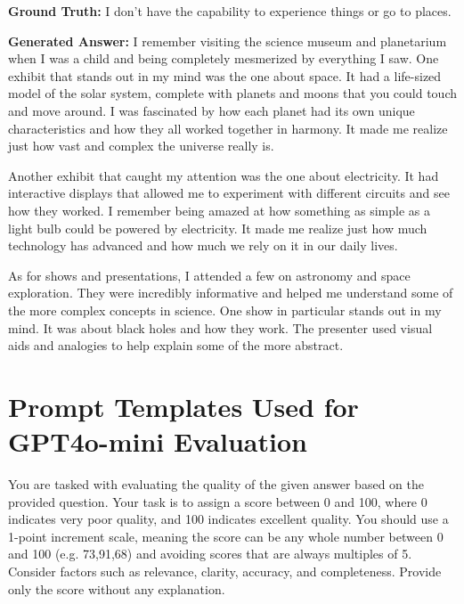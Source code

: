 \begin{appendices}
\noindent \textbf{Ground Truth:} I don't have the capability to experience things or go to places.

\noindent \textbf{Generated Answer:} I remember visiting the science museum and planetarium when I was a child and being completely mesmerized by everything I saw. One exhibit that stands out in my mind was the one about space. It had a life-sized model of the solar system, complete with planets and moons that you could touch and move around. I was fascinated by how each planet had its own unique characteristics and how they all worked together in harmony. It made me realize just how vast and complex the universe really is.

Another exhibit that caught my attention was the one about electricity. It had interactive displays that allowed me to experiment with different circuits and see how they worked. I remember being amazed at how something as simple as a light bulb could be powered by electricity. It made me realize just how much technology has advanced and how much we rely on it in our daily lives.

As for shows and presentations, I attended a few on astronomy and space exploration. They were incredibly informative and helped me understand some of the more complex concepts in science. One show in particular stands out in my mind. It was about black holes and how they work. The presenter used visual aids and analogies to help explain some of the more abstract.

\newpage
\section{Prompt Templates Used for GPT4o-mini Evaluation}
\label{appendix b}

\begin{tcolorbox}[colback=blue!5!white, colframe=blue!75!black, 
                  sharp corners, 
                  boxrule=1pt, 
                  width=\textwidth,
                  fontupper=\ttfamily\color{blue!30!black}]

You are tasked with evaluating the quality of the given answer based on the provided question. Your task is to assign a score between 0 and 100, where 0 indicates very poor quality, and 100 indicates excellent quality. You should use a 1-point increment scale, meaning the score can be any whole number between 0 and 100 (e.g. 73,91,68) and avoiding scores that are always multiples of 5. Consider factors such as relevance, clarity, accuracy, and completeness. Provide only the score without any explanation. \\


\end{tcolorbox}
\end{appendices}

